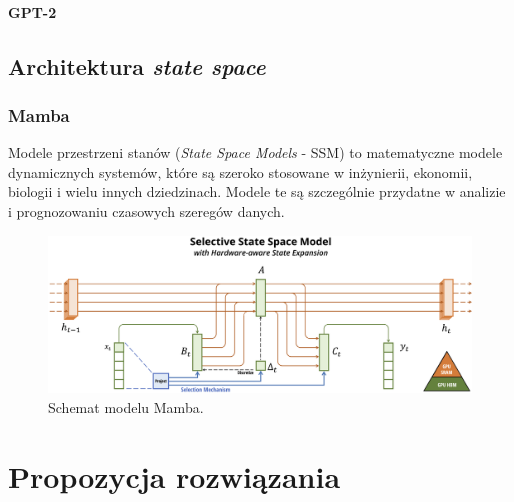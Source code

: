 \documentclass[data-science]{agh-wi} %
\begin{document}
\subsubsection*{GPT-2}\label{sec:gpt2}
\cite{gpt2}

\section{Architektura \textit{state space}}
\subsection{Mamba}

Modele przestrzeni stanów (\textit{State Space Models} - SSM) to matematyczne modele dynamicznych systemów, które są szeroko stosowane w inżynierii, ekonomii, biologii i wielu innych dziedzinach. Modele te są szczególnie przydatne w analizie i prognozowaniu czasowych szeregów danych.

\begin{figure}[ht!]
    \begin{center}
        \includegraphics[width=0.9\linewidth]{img/mamba1.png}
    \end{center}
    \caption{Schemat modelu Mamba.}
    \label{fig:mamba1}
\end{figure}

\chapter{Propozycja rozwiązania}
\end{document}
